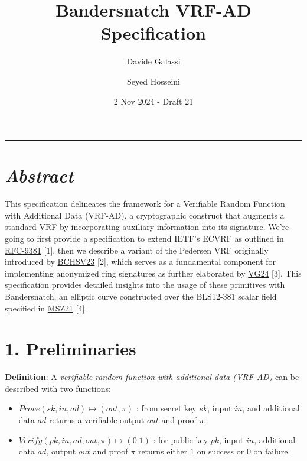 \documentclass[
]{article}
\title{Bandersnatch VRF-AD Specification}
\author{Davide Galassi \and Seyed Hosseini}
\date{2 Nov 2024 - Draft 21}
\begin{document}
\maketitle

\newcommand{\G}{\langle G \rangle}
\newcommand{\F}{\mathbb{Z}^*_r}

\begin{center}\rule{0.5\linewidth}{0.5pt}\end{center}

\hypertarget{abstract}{%
\section{\texorpdfstring{\emph{Abstract}}{Abstract}}\label{abstract}}

This specification delineates the framework for a Verifiable Random
Function with Additional Data (VRF-AD), a cryptographic construct that
augments a standard VRF by incorporating auxiliary information into its
signature. We're going to first provide a specification to extend IETF's
ECVRF as outlined in
\href{https://datatracker.ietf.org/doc/rfc9381}{RFC-9381} {[}1{]}, then
we describe a variant of the Pedersen VRF originally introduced by
\href{https://eprint.iacr.org/2023/002}{BCHSV23} {[}2{]}, which serves
as a fundamental component for implementing anonymized ring signatures
as further elaborated by
\href{https://github.com/davxy/ring-proof-spec}{VG24} {[}3{]}. This
specification provides detailed insights into the usage of these
primitives with Bandersnatch, an elliptic curve constructed over the
BLS12-381 scalar field specified in
\href{https://eprint.iacr.org/2021/1152}{MSZ21} {[}4{]}.

\hypertarget{preliminaries}{%
\section{1. Preliminaries}\label{preliminaries}}

\textbf{Definition}: A \emph{verifiable random function with additional
data (VRF-AD)} can be described with two functions:

\begin{itemize}
\item
  \(Prove(sk,in,ad) \mapsto (out,\pi)\) : from secret key \(sk\), input
  \(in\), and additional data \(ad\) returns a verifiable output \(out\)
  and proof \(\pi\).
\item
  \(Verify(pk,in,ad,out,\pi) \mapsto (0|1)\) : for public key \(pk\),
  input \(in\), additional data \(ad\), output \(out\) and proof \(\pi\)
  returns either \(1\) on success or \(0\) on failure.
\end{itemize}
\end{document}
